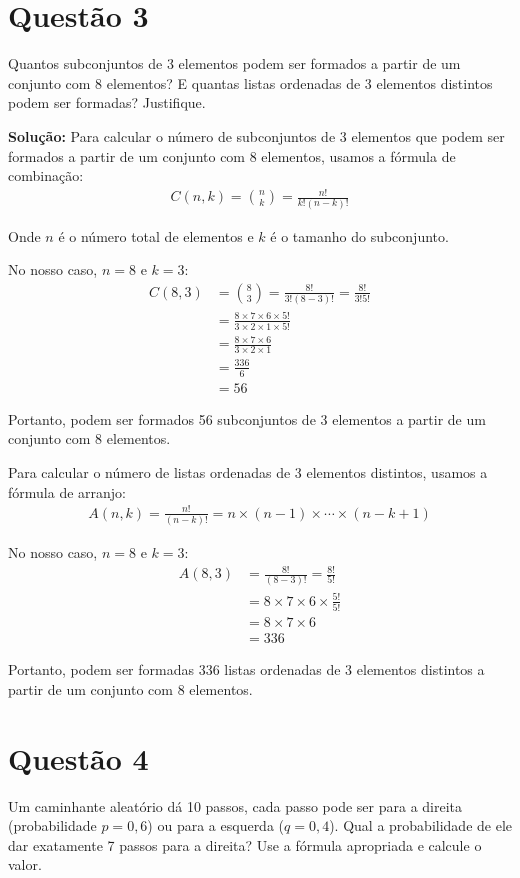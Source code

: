 \documentclass[fleqn,a4paper]{article}
\begin{document}
\section*{Questão 3}
Quantos subconjuntos de 3 elementos podem ser formados a partir de um conjunto com 8 elementos? E quantas listas ordenadas de 3 elementos distintos podem ser formadas? Justifique.

\textbf{Solução:}
Para calcular o número de subconjuntos de 3 elementos que podem ser formados a partir de um conjunto com 8 elementos, usamos a fórmula de combinação:
\begin{align}
C(n,k) = \binom{n}{k} = \frac{n!}{k!(n-k)!}
\end{align}

Onde $n$ é o número total de elementos e $k$ é o tamanho do subconjunto.

No nosso caso, $n = 8$ e $k = 3$:
\begin{align}
C(8,3) &= \binom{8}{3} = \frac{8!}{3!(8-3)!} = \frac{8!}{3!5!} \\
&= \frac{8 \times 7 \times 6 \times 5!}{3 \times 2 \times 1 \times 5!} \\
&= \frac{8 \times 7 \times 6}{3 \times 2 \times 1} \\
&= \frac{336}{6} \\
&= 56
\end{align}

Portanto, podem ser formados 56 subconjuntos de 3 elementos a partir de um conjunto com 8 elementos.

Para calcular o número de listas ordenadas de 3 elementos distintos, usamos a fórmula de arranjo:
\begin{align}
A(n,k) = \frac{n!}{(n-k)!} = n \times (n-1) \times \cdots \times (n-k+1)
\end{align}

No nosso caso, $n = 8$ e $k = 3$:
\begin{align}
A(8,3) &= \frac{8!}{(8-3)!} = \frac{8!}{5!} \\
&= 8 \times 7 \times 6 \times \frac{5!}{5!} \\
&= 8 \times 7 \times 6 \\
&= 336
\end{align}

Portanto, podem ser formadas 336 listas ordenadas de 3 elementos distintos a partir de um conjunto com 8 elementos.

\section*{Questão 4}
Um caminhante aleatório dá 10 passos, cada passo pode ser para a direita (probabilidade $p=0,6$) ou para a esquerda ($q=0,4$). Qual a probabilidade de ele dar exatamente 7 passos para a direita? Use a fórmula apropriada e calcule o valor.
\end{document}
